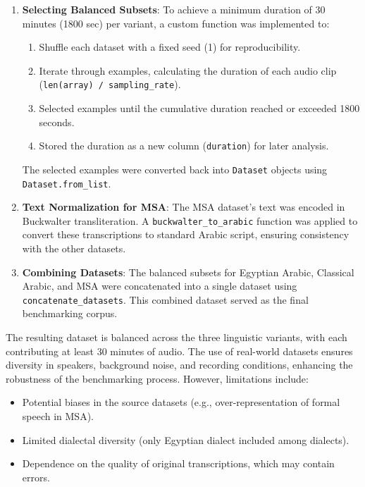 \documentclass[12pt]{article}
\begin{document}
\begin{enumerate}
    \item \textbf{Selecting Balanced Subsets}:
        To achieve a minimum duration of 30 minutes (1800 sec) per variant, a custom function was implemented to:
        \begin{enumerate}
            \item Shuffle each dataset with a fixed seed (1) for reproducibility.
            \item Iterate through examples, calculating the duration of each audio clip (\texttt{len(array) / sampling\_rate}).
            \item Selected examples until the cumulative duration reached or exceeded 1800 seconds.
            \item Stored the duration as a new column (\texttt{duration}) for later analysis.
        \end{enumerate}
        The selected examples were converted back into \texttt{Dataset} objects using \texttt{Dataset.from\_list}.

    \item \textbf{Text Normalization for MSA}:
        The MSA dataset's text was encoded in Buckwalter transliteration. A \texttt{buckwalter\_to\_arabic} function was applied to convert these transcriptions to standard Arabic script, ensuring consistency with the other datasets.

    \item \textbf{Combining Datasets}:
        The balanced subsets for Egyptian Arabic, Classical Arabic, and MSA were concatenated into a single dataset using \texttt{concatenate\_datasets}. This combined dataset served as the final benchmarking corpus.

\end{enumerate}


The resulting dataset is balanced across the three linguistic variants, with each contributing at least 30 minutes of audio. The use of real-world datasets ensures diversity in speakers, background noise, and recording conditions, enhancing the robustness of the benchmarking process. However, limitations include:
\begin{itemize}
    \item Potential biases in the source datasets (e.g., over-representation of formal speech in MSA).
    \item Limited dialectal diversity (only Egyptian dialect included among dialects).
    \item Dependence on the quality of original transcriptions, which may contain errors.
\end{itemize}
\end{document}
